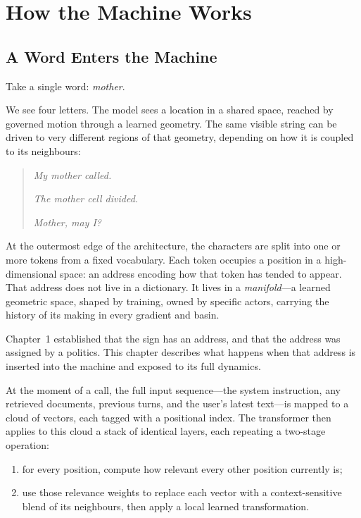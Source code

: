 
\chapter{How the Machine Works}
\thispagestyle{plain}

\bigskip

\section{A Word Enters the Machine}

Take a single word: \emph{mother}.

We see four letters. The model sees a location in a shared space, reached by governed motion through a learned geometry. The same visible string can be driven to very different regions of that geometry, depending on how it is coupled to its neighbours:

\begin{quote}
\emph{My mother called.}

\emph{The mother cell divided.}

\emph{Mother, may I?}
\end{quote}

At the outermost edge of the architecture, the characters are split into one or more tokens from a fixed vocabulary. Each token occupies a position in a high-dimensional space: an address encoding how that token has tended to appear. That address does not live in a dictionary. It lives in a \emph{manifold}---a learned geometric space, shaped by training, owned by specific actors, carrying the history of its making in every gradient and basin.

Chapter~1 established that the sign has an address, and that the address was assigned by a politics. This chapter describes what happens when that address is inserted into the machine and exposed to its full dynamics.

At the moment of a call, the full input sequence---the system instruction, any retrieved documents, previous turns, and the user's latest text---is mapped to a cloud of vectors, each tagged with a positional index. The transformer then applies to this cloud a stack of identical layers, each repeating a two-stage operation:

\begin{enumerate}
  \item for every position, compute how relevant every other position currently is;
  \item use those relevance weights to replace each vector with a context-sensitive blend of its neighbours, then apply a local learned transformation.
\end{enumerate}

